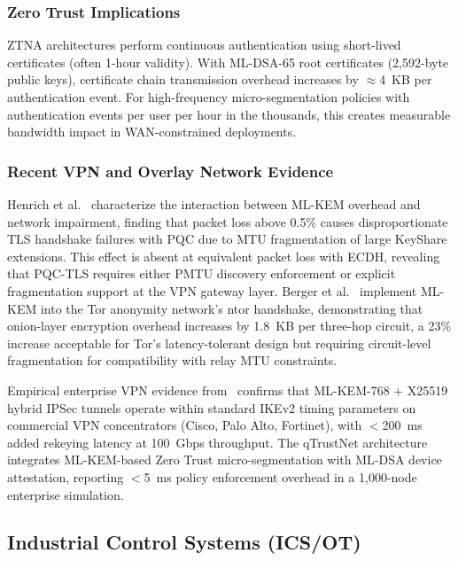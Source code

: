 \documentclass[journal]{IEEEtran}
\begin{document}
\subsubsection{Zero Trust Implications}

ZTNA architectures perform continuous authentication using short-lived
certificates (often 1-hour validity). With ML-DSA-65 root certificates
(2,592-byte public keys), certificate chain transmission overhead increases
by $\approx$4~KB per authentication event. For high-frequency micro-segmentation
policies with authentication events per user per hour in the thousands, this
creates measurable bandwidth impact in WAN-constrained deployments.

\subsubsection{Recent VPN and Overlay Network Evidence}

Henrich et al.~\cite{henrich2023performance} characterize the interaction
between ML-KEM overhead and network impairment, finding that packet loss
above 0.5\% causes disproportionate TLS handshake failures with PQC due to
MTU fragmentation of large KeyShare extensions. This effect is absent at
equivalent packet loss with ECDH, revealing that PQC-TLS requires either
PMTU discovery enforcement or explicit fragmentation support at the VPN
gateway layer. Berger et al.~\cite{berger2025postquantum} implement ML-KEM
into the Tor anonymity network's ntor handshake, demonstrating that
onion-layer encryption overhead increases by 1.8~KB per three-hop circuit,
a 23\% increase acceptable for Tor's latency-tolerant design but requiring
circuit-level fragmentation for compatibility with relay MTU constraints.

Empirical enterprise VPN evidence from~\cite{vpn2024ictc} confirms that
ML-KEM-768 + X25519 hybrid IPSec tunnels operate within standard IKEv2
timing parameters on commercial VPN concentrators (Cisco, Palo Alto, Fortinet),
with $<$200~ms added rekeying latency at 100~Gbps throughput. The qTrustNet
architecture~\cite{qtrustnet2025} integrates ML-KEM-based Zero Trust
micro-segmentation with ML-DSA device attestation, reporting $<$5~ms policy
enforcement overhead in a 1{,}000-node enterprise simulation.

\subsection{Industrial Control Systems (ICS/OT)}
\label{sec:ics}
\end{document}
